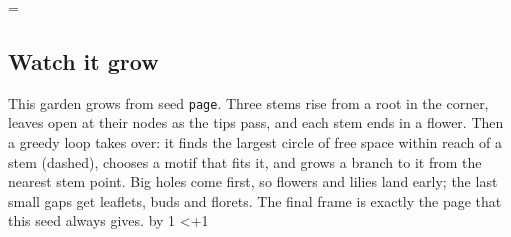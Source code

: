 \documentclass[11pt,a4paper]{article}
\begin{document}
\animk=\animfrom\relax
\loop
  \setcounter{page}{1}\setcounter{section}{3}\setcounter{subsection}{2}
  \florilegiumframe[\animexplain]{\the\animk}{\animframes}
  \subsection{Watch it grow}

  This garden grows from seed \texttt{\ifx\florilegiumseed\empty page\else\florilegiumseed\fi}.
  Three stems rise from a root in the corner, leaves open at their nodes as the tips pass,
  and each stem ends in a flower. Then a greedy loop takes over: it finds the largest
  circle of free space within reach of a stem\ifx\animexplain\empty\else{} (dashed)\fi,
  chooses a motif that fits it, and grows a branch to it from the nearest stem point. Big
  holes come first, so flowers and lilies land early; the last small gaps get leaflets,
  buds and florets. The final frame is exactly the page that this seed always gives.
  \florilegiumtextend
  \clearpage
  \advance\animk by 1
\ifnum\animk<\numexpr\animto+1\relax\repeat
\end{document}
